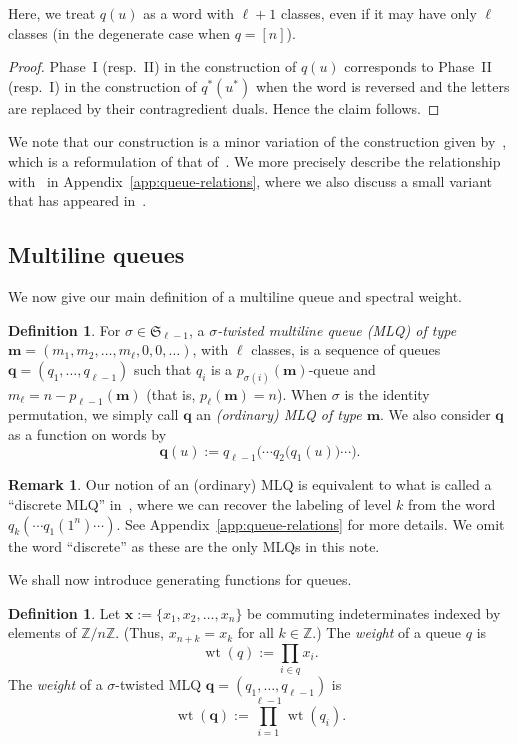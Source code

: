 \documentclass[reqno]{amsart}
\newcommand{\0}{\phantom{c}}
\newcommand{\SymGp}[1]{\mathfrak{S}_{#1}} %
\DeclareMathOperator{\wt}{wt} %
\newcommand{\mm}{\mathbf{m}}
\newcommand{\qq}{\mathbf{q}}
\newcommand{\xx}{\mathbf{x}}
\newcommand{\ZZ}{\mathbb{Z}}
\let\prodnonlimits\prod
\renewcommand{\prod}{\prodnonlimits\limits}
\newcommand{\tup}[1]{\left( #1 \right)}
\newcommand{\ive}[1]{\left[ #1 \right]}
\newcommand{\defn}[1]{{\color{darkred}\emph{#1}}} %
\theoremstyle{plain}
\theoremstyle{definition}
\newtheorem{dfn}[thm]{Definition}
\newtheorem{remark}[thm]{Remark}
\numberwithin{equation}{section}
\begin{document}
Here, we treat $q(u)$ as a word with $\ell+1$ classes, even if it may have only $\ell$ classes (in the degenerate case when $q = \ive{n}$).

\begin{proof}
Phase~I (resp.~II) in the construction of $q(u)$ corresponds to Phase~II (resp.~I) in the construction of $q^*(u^*)$ when the word is reversed and the letters are replaced by their contragredient duals.
Hence the claim follows.
\end{proof}

We note that our construction is a minor variation of the construction given by~\cite[\S 3.1]{AAMP}, which is a reformulation of that of~\cite{FM07}.
We more precisely describe the relationship with~\cite{FM07} in Appendix~\ref{app:queue-relations}, where we also discuss a small variant that has appeared in~\cite{AssSea18}.


\subsection{Multiline queues}

We now give our main definition of a multiline queue and spectral weight.

\begin{dfn}
For $\sigma \in \SymGp{\ell-1}$, a \defn{$\sigma$-twisted multiline queue (MLQ) of type $\mm = \tup{m_1, m_2, \ldots, m_\ell, 0, 0, \ldots}$}, with $\ell$ classes, is a sequence of queues $\qq = (q_1, \dotsc, q_{\ell-1})$ such that $q_i$ is a $p_{\sigma(i)}(\mm)$-queue and $m_{\ell} = n - p_{\ell-1}(\mm)$ (that is, $p_\ell(\mm) = n$).
When $\sigma$ is the identity permutation, we simply call $\qq$ an \defn{(ordinary) MLQ of type $\mm$}.
We also consider $\qq$ as a function on words by
\[
\qq(u) := q_{\ell-1}\bigl( \cdots q_2\bigl( q_1(u) \bigr) \cdots \bigr).
\]
\end{dfn}

\begin{remark}
Our notion of an (ordinary) MLQ is equivalent to what is called a ``discrete MLQ'' in~\cite[\S 2.2]{AasLin17}, where we can recover the labeling of level $k$ from the word $q_k( \cdots q_1(1^n) \cdots )$.
See Appendix~\ref{app:queue-relations} for more details.
We omit the word ``discrete'' as these are the only MLQs in this note.
\end{remark}

We shall now introduce generating functions for queues.

\begin{dfn}
Let $\xx := \{x_1, x_2, \ldots, x_n\}$ be commuting indeterminates indexed by elements of $\ZZ / n \ZZ$.
(Thus, $x_{n+k} = x_k$ for all $k \in \ZZ$.)
The \defn{weight} of a queue $q$ is
\[
  \wt(q) := \prod_{i \in q} x_i.
\]
The \defn{weight} of a $\sigma$-twisted MLQ $\qq = (q_1, \dotsc, q_{\ell-1})$ is
\[
  \wt(\qq) := \prod_{i=1}^{\ell-1} \wt(q_i).
\]
\end{dfn}
\end{document}
